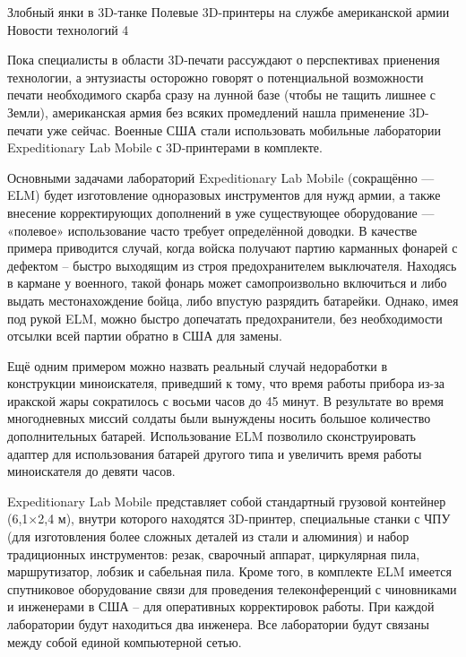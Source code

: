 
\begin{news}{2}
	{Злобный янки в 3D-танке}
	{Полевые 3D-принтеры на службе американской армии}
	{Новости технологий}
	{4}

Пока специалисты в области 3D-печати рассуждают о перспективах приенения
технологии, а энтузиасты осторожно говорят о потенциальной возможности печати
необходимого скарба сразу на лунной базе (чтобы не тащить лишнее с Земли),
американская армия без всяких промедлений нашла применение 3D-печати уже сейчас.
Военные США стали использовать мобильные лаборатории Expeditionary Lab Mobile с
3D-принтерами в комплекте.


Основными задачами лабораторий Expeditionary Lab Mobile (сокращённо — ELM) будет
изготовление одноразовых инструментов для нужд армии, а также внесение
корректирующих дополнений в уже существующее оборудование — «полевое»
использование часто требует определённой доводки. В качестве примера приводится
случай, когда войска получают партию карманных фонарей с дефектом – быстро
выходящим из строя предохранителем выключателя. Находясь в кармане у военного,
такой фонарь может самопроизвольно включиться и либо выдать местонахождение
бойца, либо впустую разрядить батарейки. Однако, имея под рукой ELM, можно
быстро допечатать предохранители, без необходимости отсылки всей партии обратно
в США для замены. 


Ещё одним примером можно назвать реальный случай недоработки в
конструкции миноискателя, приведший к тому, что время работы прибора из-за
иракской жары сократилось с восьми часов до 45 минут. В результате во время
многодневных миссий солдаты были вынуждены носить большое количество
дополнительных батарей. Использование ELM позволило сконструировать адаптер для
использования батарей другого типа и увеличить время работы миноискателя до
девяти часов.

Expeditionary Lab Mobile представляет собой стандартный грузовой контейнер
(6,1$\times$2,4 м), внутри которого находятся 3D-принтер, специальные станки с
ЧПУ (для изготовления более сложных деталей из стали и алюминия) и набор
традиционных инструментов: резак, сварочный аппарат, циркулярная пила,
маршрутизатор, лобзик и сабельная пила. Кроме того, в комплекте ELM имеется
спутниковое оборудование связи для проведения телеконференций с чиновниками и
инженерами в США – для оперативных корректировок работы. При каждой лаборатории
будут находиться два инженера. Все лаборатории будут связаны между собой единой
компьютерной сетью.


\end{news}
